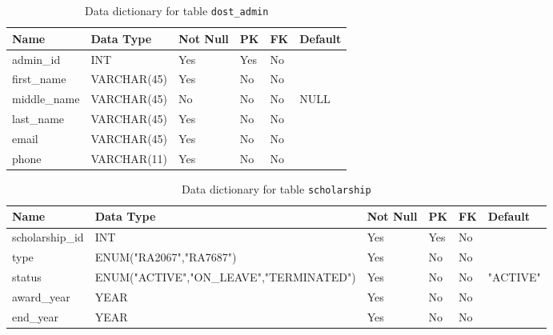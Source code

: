 \documentclass{article}
\newcommand{\tname}[1]{\color{blue}\texttt{#1}}
\begin{document}
\begin{table}[H]
    \centering
    \begin{tabularx}{\textwidth}{m{1.0in}Xllll}
        \hline
        Name         & Data Type   & Not Null & PK  & FK & Default \\ \hline
        admin\_id    & INT         & Yes      & Yes & No & ~       \\
        first\_name  & VARCHAR(45) & Yes      & No  & No & ~       \\
        middle\_name & VARCHAR(45) & No       & No  & No & NULL    \\
        last\_name   & VARCHAR(45) & Yes      & No  & No & ~       \\
        email        & VARCHAR(45) & Yes      & No  & No & ~       \\
        phone        & VARCHAR(11) & Yes      & No  & No & ~       \\
    \end{tabularx}
    \caption{Data dictionary for table \tname{dost\_admin}}
\end{table}

\begin{table}[H]
    \centering
    \begin{tabularx}{\textwidth}{m{1.0in}Xllll}
        \hline
        Name            & Data Type                               & Not Null & PK  & FK & Default  \\ \hline
        scholarship\_id & INT                                     & Yes      & Yes & No & ~        \\
        type            & ENUM("RA2067","RA7687")                 & Yes      & No  & No & ~        \\
        status          & ENUM("ACTIVE","ON\_LEAVE","TERMINATED") & Yes      & No  & No & "ACTIVE" \\
        award\_year     & YEAR                                    & Yes      & No  & No & ~        \\
        end\_year       & YEAR                                    & Yes      & No  & No & ~        \\
    \end{tabularx}
    \caption{Data dictionary for table \tname{scholarship}}
\end{table}
\end{document}
